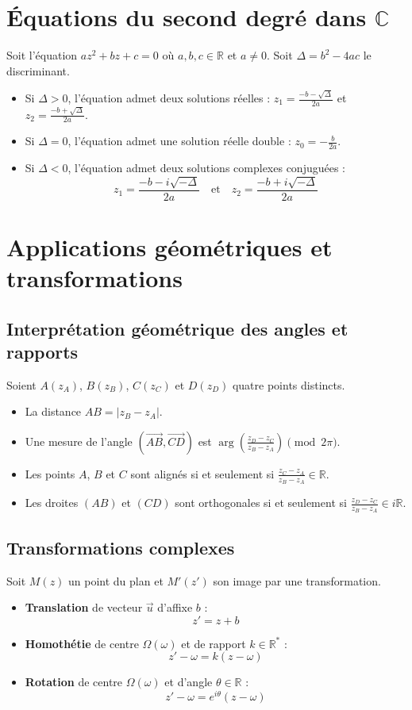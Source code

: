 \documentclass{article}
\begin{document}
	\section{Équations du second degré dans $\mathbb{C}$}
	Soit l'équation $az^2 + bz + c = 0$ où $a, b, c \in \mathbb{R}$ et $a \ne 0$.
	Soit $\Delta = b^2 - 4ac$ le discriminant.
	\begin{itemize}
		\item Si $\Delta > 0$, l'équation admet deux solutions réelles : $z_1 = \frac{-b-\sqrt{\Delta}}{2a}$ et $z_2 = \frac{-b+\sqrt{\Delta}}{2a}$.
		\item Si $\Delta = 0$, l'équation admet une solution réelle double : $z_0 = -\frac{b}{2a}$.
		\item Si $\Delta < 0$, l'équation admet deux solutions complexes conjuguées :
		\[ z_1 = \frac{-b-i\sqrt{-\Delta}}{2a} \quad \text{et} \quad z_2 = \frac{-b+i\sqrt{-\Delta}}{2a} \]
	\end{itemize}
	
	\section{Applications géométriques et transformations}
	
	\subsection{Interprétation géométrique des angles et rapports}
	Soient $A(z_A)$, $B(z_B)$, $C(z_C)$ et $D(z_D)$ quatre points distincts.
	\begin{itemize}
		\item La distance $AB = |z_B - z_A|$.
		\item Une mesure de l'angle $(\overrightarrow{AB}, \overrightarrow{CD})$ est $\arg\left(\frac{z_D - z_C}{z_B - z_A}\right) \pmod{2\pi}$.
		\item Les points $A$, $B$ et $C$ sont alignés si et seulement si $\frac{z_C - z_A}{z_B - z_A} \in \mathbb{R}$.
		\item Les droites $(AB)$ et $(CD)$ sont orthogonales si et seulement si $\frac{z_D - z_C}{z_B - z_A} \in i\mathbb{R}$.
	\end{itemize}
	
	\subsection{Transformations complexes}
	Soit $M(z)$ un point du plan et $M'(z')$ son image par une transformation.
	\begin{itemize}
		\item \textbf{Translation} de vecteur $\vec{u}$ d'affixe $b$ :
		\[ z' = z + b \]
		\item \textbf{Homothétie} de centre $\Omega(\omega)$ et de rapport $k \in \mathbb{R}^*$ :
		\[ z' - \omega = k(z - \omega) \]
		\item \textbf{Rotation} de centre $\Omega(\omega)$ et d'angle $\theta \in \mathbb{R}$ :
		\[ z' - \omega = e^{i\theta}(z - \omega) \]
	\end{itemize}
	
\end{document}
